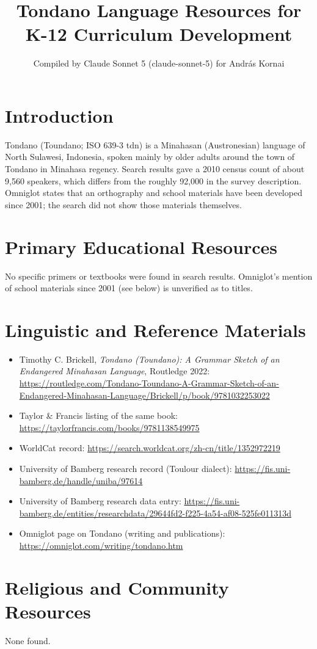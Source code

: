 \documentclass[12pt]{article}
\title{Tondano Language Resources for K-12 Curriculum Development}
\author{Compiled by Claude Sonnet 5 (claude-sonnet-5) for Andr\'as Kornai}
\date{}
\begin{document}
\maketitle
\section{Introduction}
Tondano (Toundano; ISO 639-3 tdn) is a Minahasan (Austronesian) language of North Sulawesi, Indonesia, spoken mainly by older adults around the town of Tondano in Minahasa regency. Search results gave a 2010 census count of about 9,560 speakers, which differs from the roughly 92,000 in the survey description. Omniglot states that an orthography and school materials have been developed since 2001; the search did not show those materials themselves.
\section{Primary Educational Resources}
No specific primers or textbooks were found in search results. Omniglot's mention of school materials since 2001 (see below) is unverified as to titles.
\section{Linguistic and Reference Materials}
\begin{itemize}
\item Timothy C. Brickell, \emph{Tondano (Toundano): A Grammar Sketch of an Endangered Minahasan Language}, Routledge 2022: \url{https://routledge.com/Tondano-Toundano-A-Grammar-Sketch-of-an-Endangered-Minahasan-Language/Brickell/p/book/9781032253022}
\item Taylor \& Francis listing of the same book: \url{https://taylorfrancis.com/books/9781138549975}
\item WorldCat record: \url{https://search.worldcat.org/zh-cn/title/1352972219}
\item University of Bamberg research record (Toulour dialect): \url{https://fis.uni-bamberg.de/handle/uniba/97614}
\item University of Bamberg research data entry: \url{https://fis.uni-bamberg.de/entities/researchdata/29644fd2-f225-4a54-af08-525fe011313d}
\item Omniglot page on Tondano (writing and publications): \url{https://omniglot.com/writing/tondano.htm}
\end{itemize}
\section{Religious and Community Resources}
None found.
\end{document}
